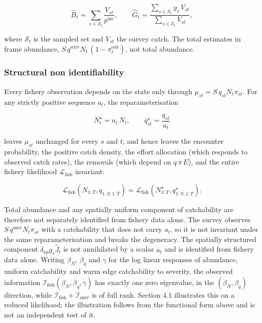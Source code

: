 \documentclass[
  11pt,
  a4paper,
]{article}
\begin{document}
\begin{equation}
\widehat{B}_t = \sum_{s \in \mathcal{S}_t} \frac{V_{st}}{p^{\text{inc}}}, \qquad \widehat{G}_t = \frac{\sum_{s \in \mathcal{S}_t} y_s\,V_{st}}{\sum_{s \in \mathcal{S}_t} V_{st}},
\end{equation}

\noindent where \(\mathcal{S}_t\) is the sampled set and \(V_{st}\) the survey
catch. The total estimates in frame abundance,
\(S\,q^{\text{surv}} N_t\,(1 - \pi^{\text{out}}_t)\), not total
abundance.

\hypertarget{structural-non-identifiability}{%
\subsubsection{Structural non
identifiability}\label{structural-non-identifiability}}

Every fishery observation depends on the state only through
\(\mu_{st} = S\,q_{st} N_t \pi_{st}\). For any strictly positive
sequence \(a_t\), the reparameterisation

\begin{equation}
N_t^{\star} = a_t\,N_t, \qquad q_{st}^{\star} = \frac{q_{st}}{a_t}
\end{equation}

\noindent leaves \(\mu_{st}\) unchanged for every \(s\) and \(t\), and hence
leaves the encounter probability, the positive catch density, the effort
allocation (which responds to observed catch rates), the removals (which
depend on \(q\,\pi\,E\)), and the entire fishery likelihood
\(\mathcal{L}_{\text{fish}}\) invariant:

\begin{equation}
\mathcal{L}_{\text{fish}}\!\left(N_{1:T}, q_{1:S,1:T}\right) = \mathcal{L}_{\text{fish}}\!\left(N_{1:T}^{\star}, q_{1:S,1:T}^{\star}\right).
\end{equation}

\noindent Total abundance and any spatially uniform component of catchability are
therefore not separately identified from fishery data alone. The survey
observes \(S\,q^{\text{surv}} N_t \pi_{st}\) with a catchability that
does not carry \(a_t\), so it is not invariant under the same
reparameterisation and breaks the degeneracy. The spatially structured
component \(\delta_{\text{sp}} g_s \hat{J}_t\) is not annihilated by a
scalar \(a_t\) and is identified from fishery data alone. Writing
\(\beta_N\), \(\beta_q\) and \(\gamma\) for the log linear responses of
abundance, uniform catchability and warm edge catchability to severity,
the observed information
\(\mathcal{I}_{\text{fish}}(\beta_N, \beta_q, \gamma)\) has exactly one
zero eigenvalue, in the \((\beta_N, \beta_q)\) direction, while
\(\mathcal{I}_{\text{fish}} + \mathcal{I}_{\text{surv}}\) is of full
rank. Section 4.1 illustrates this on a reduced likelihood; the
illustration follows from the functional form above and is not an
independent test of it.
\end{document}
